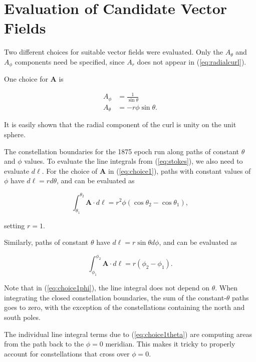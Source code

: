 \documentclass[11pt]{article}
\newcommand{\bvec}[1]{\bm{#1}}
\begin{document}
\section{Evaluation of Candidate Vector Fields}

Two different choices for suitable vector fields were evaluated. Only the $A_\theta$ and $A_\phi$ components need be specified,
since $A_r$ does not appear in (\ref{eq:radialcurl}).

One choice for $\bvec{A}$ is

\begin{equation}
\begin{split}
	A_\phi &= \frac{1}{\sin\theta} \\
	A_\theta &= -r \phi \sin\theta.
	\label{eq:choice1}
\end{split}
\end{equation}

It is easily shown that the radial component of the curl is unity on the unit sphere.

The constellation boundaries for the 1875 epoch run along paths of constant $\theta$ and $\phi$ values. To evaluate
the line integrals from (\ref{eq:stokes}), we also need to evaluate $d\bvec{\ell}$.  For the choice of $\bvec{A}$ in
(\ref{eq:choice1}), paths with constant values of $\phi$ have $d\ell = r d\theta$, and can be evaluated as

\begin{equation}
	\int_{\theta_1}^{\theta_2}  \bvec{A} \cdot d\bvec{\ell} = r^2 \phi \left( \cos\theta_2 - \cos\theta_1 \right),
	\label{eq:choice1theta}
\end{equation}

setting $r=1$.

Similarly, paths of constant $\theta$ have $d\ell = r \sin\theta d\phi$, and can be evaluated as

\begin{equation}
	\int_{\phi_1}^{\phi_2} \bvec{A} \cdot d\bvec{\ell} = r \left( \phi_2 - \phi_1 \right).
	\label{eq:choice1phi}
\end{equation}

Note that in (\ref{eq:choice1phi}), the line integral does not depend on $\theta$.  When integrating the closed
constellation boundaries, the sum of the constant-$\theta$ paths goes to zero, with the exception of the
constellations containing the north and south poles.

The individual line integral terms due to (\ref{eq:choice1theta}) are computing areas from the path back to the $\phi=0$
meridian.  This makes it tricky to properly account for constellations that cross over $\phi=0$.
\end{document}
